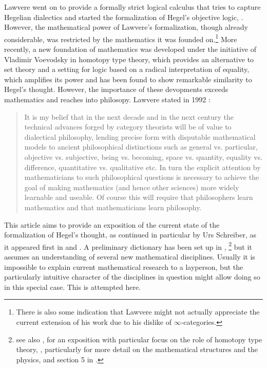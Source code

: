 \documentclass{article}
\begin{document}
Lawvere went on to provide a formally strict logical calculus that tries to capture Hegelian dialectics
and started the formalization of Hegel's objective logic, \cite{Law91}. However, the mathematical power
of Lawvere's formalization, though already considerable, was restricted by the mathematics it was founded
on.\footnote{There is also some indication that Lawvere might not actually appreciate the current extension
of his work due to his dislike of $\infty$-categories.} More recently, a new foundation of mathematics
was developed under the initiative of Vladimir Voevodsky in homotopy type theory, which provides an alternative
to set theory and a setting for logic based on a radical interpretation of equality, which amplifies its
power and has been found to show remarkable similarity to Hegel's thought. However, the importance of
these devopments exceeds mathematics and reaches into philosopy. Lawvere stated in 1992 \cite{Lawvere92}:


\begin{quote}
It is my belief that in the next decade and in the next century the technical advances forged by category
theorists will be of value to dialectical philosophy, lending precise form with disputable mathematical
models to ancient philosophical distinctions such as general vs. particular, objective vs. subjective,
being vs. becoming, space vs. quantity, equality vs. difference, quantitative vs. qualitative etc. In
turn the explicit attention by mathematicians to such philosophical questions is necessary to achieve
the goal of making mathematics (and hence other sciences) more widely learnable and useable. Of course
this will require that philosophers learn mathematics and that mathematicians learn philosophy.    
\end{quote}

This article aims to provide an exposition of the current state of the formalization of Hegel's thought,
as continued in particular by Urs Schreiber, as it appeared first in \cite{SQuant} and \cite{SSOrb}. A
preliminary dictionary has been set up in \cite{nlabsol}, \footnote{see also \cite{Stalk}, \cite{SSh} for
an exposition with particular focus on the role of homotopy type theory, \cite{dcct}, particularly for
more detail on the mathematical structures and the physics, and section 5 in \cite{Cor}.} but it assumes
an understanding of several new mathematical disciplines. Usually it is impossible to explain current
mathematical research to a layperson, but the particularly intuitive character of the disciplines in question
might allow doing so in this special case. This is attempted here.
\end{document}
